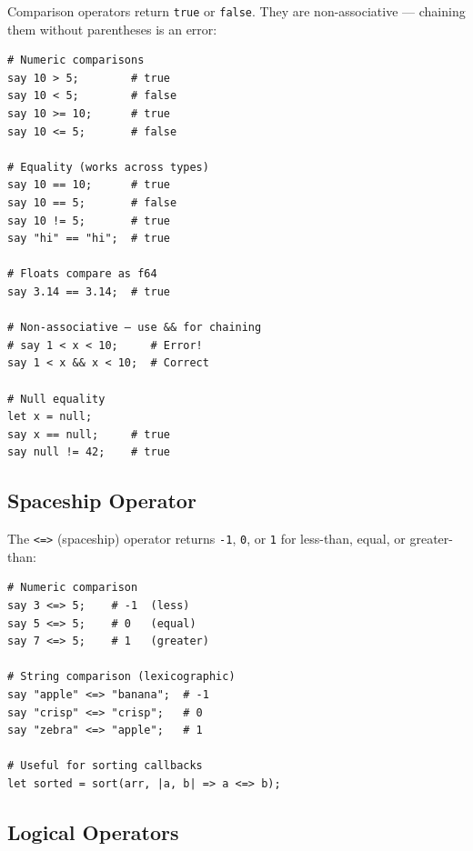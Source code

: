 Comparison operators return \texttt{true} or \texttt{false}. They are non-associative — chaining them without parentheses is an error:

\begin{tcolorbox}[colback=codebg, colframe=darkpurple, colbacktitle=darkpurple, title=\textbf{\textcolor{codegold}{Comparison Operators}}, fonttitle=\bfseries, sharp corners]
\begin{lstlisting}
# Numeric comparisons
say 10 > 5;        # true
say 10 < 5;        # false
say 10 >= 10;      # true
say 10 <= 5;       # false

# Equality (works across types)
say 10 == 10;      # true
say 10 == 5;       # false
say 10 != 5;       # true
say "hi" == "hi";  # true

# Floats compare as f64
say 3.14 == 3.14;  # true

# Non-associative — use && for chaining
# say 1 < x < 10;     # Error!
say 1 < x && x < 10;  # Correct

# Null equality
let x = null;
say x == null;     # true
say null != 42;    # true
\end{lstlisting}
\end{tcolorbox}

\subsection{Spaceship Operator}

The \texttt{<=>} (spaceship) operator returns \texttt{-1}, \texttt{0}, or \texttt{1} for less-than, equal, or greater-than:

\begin{tcolorbox}[colback=codebg, colframe=darkpurple, colbacktitle=darkpurple, title=\textbf{\textcolor{codegold}{Spaceship Operator}}, fonttitle=\bfseries, sharp corners]
\begin{lstlisting}
# Numeric comparison
say 3 <=> 5;    # -1  (less)
say 5 <=> 5;    # 0   (equal)
say 7 <=> 5;    # 1   (greater)

# String comparison (lexicographic)
say "apple" <=> "banana";  # -1
say "crisp" <=> "crisp";   # 0
say "zebra" <=> "apple";   # 1

# Useful for sorting callbacks
let sorted = sort(arr, |a, b| => a <=> b);
\end{lstlisting}
\end{tcolorbox}

\subsection{Logical Operators}

